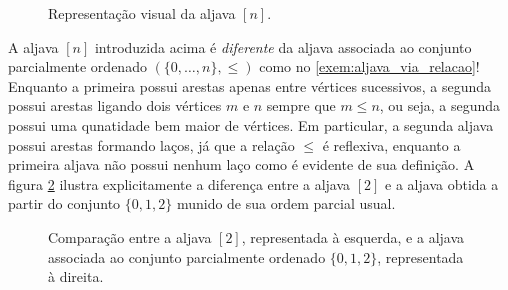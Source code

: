 \begin{figure}[h]
    \centering
    \caption{Representação visual da aljava $[n]$.}
    \label{fig:aljava_ordinal}
\end{figure}

\begin{obs}
    A aljava $[n]$ introduzida acima é \emph{diferente} da aljava associada ao conjunto parcialmente ordenado $(\{0,\dots,n\},\leq)$ como no \cref{exem:aljava_via_relacao}!
    Enquanto a primeira possui arestas apenas entre vértices sucessivos, a segunda possui arestas ligando dois vértices $m$ e $n$ sempre que $m \leq n$, ou seja, a segunda possui uma qunatidade bem maior de vértices.
    Em particular, a segunda aljava possui arestas formando laços, já que a relação $\leq$ é reflexiva, enquanto a primeira aljava não possui nenhum laço como é evidente de sua definição.
    A figura \cref{fig:aljava_ordinal_versus_aljava_poset} ilustra explicitamente a diferença entre a aljava $[2]$ e a aljava obtida a partir do conjunto $\{0,1,2\}$ munido de sua ordem parcial usual.
    
    \begin{figure}
        \centering
        \caption{Comparação entre a aljava $[2]$, representada à esquerda, e a aljava associada ao conjunto parcialmente ordenado $\{0,1,2\}$, representada à direita.}
        \label{fig:aljava_ordinal_versus_aljava_poset}
    \end{figure}
\end{obs}

